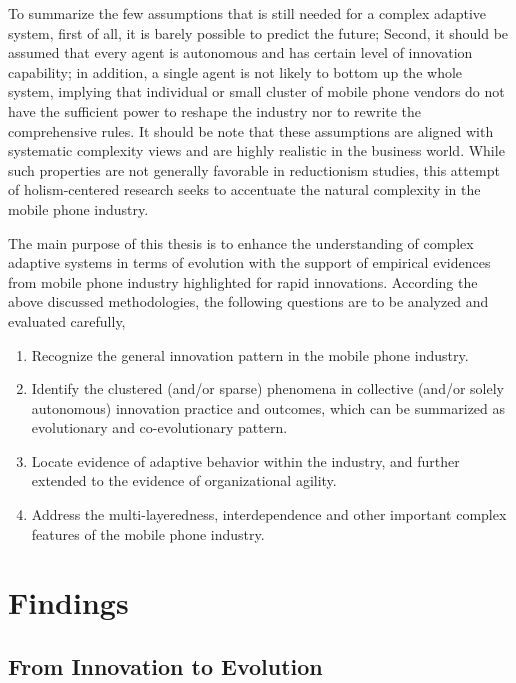 \documentclass[utf8,english]{gradu3}
\begin{document}
To summarize the few assumptions that is still needed for a complex adaptive system, first of all, it is barely possible to predict the future; Second, it should be assumed that every agent is autonomous and has certain level of innovation capability; in addition, a single agent is not likely to bottom up the whole system, implying that individual or small cluster of mobile phone vendors do not have the sufficient power to reshape the industry nor to rewrite the comprehensive rules. It should be note that these assumptions are aligned with systematic complexity views and are highly realistic in the business world. While such properties are not generally favorable in reductionism studies, this attempt of holism-centered research seeks to accentuate the natural complexity in the mobile phone industry.

The main purpose of this thesis is to enhance the understanding of complex adaptive systems in terms of evolution with the support of empirical evidences from mobile phone industry highlighted for rapid innovations. According the above discussed methodologies, the following questions are to be analyzed and evaluated carefully,

\begin{enumerate}
    \item Recognize the general innovation pattern in the mobile phone industry.
    \item Identify the clustered (and/or sparse) phenomena in collective (and/or solely autonomous) innovation practice and outcomes, which can be summarized as evolutionary and co-evolutionary pattern.
    \item Locate evidence of adaptive behavior within the industry, and further extended to the evidence of organizational agility.
    \item Address the multi-layeredness, interdependence and other important complex features of the mobile phone industry.
\end{enumerate}

\chapter{Findings}

\section{From Innovation to Evolution}
\end{document}
